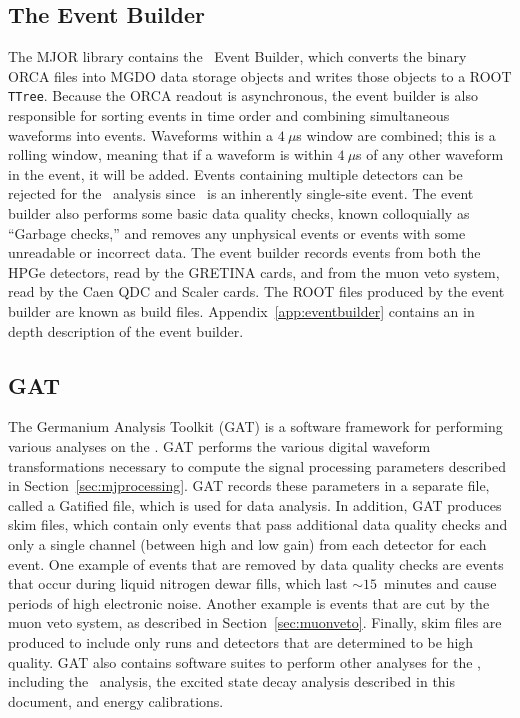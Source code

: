 \documentclass[/main.tex]{subfiles}
\begin{document}
\subsection{The Event Builder}\label{sec:eventbuilder}
The MJOR library contains the \MJ\ Event Builder, which converts the binary ORCA files into MGDO data storage objects and writes those objects to a ROOT \texttt{TTree}.
Because the ORCA readout is asynchronous, the event builder is also responsible for sorting events in time order and combining simultaneous waveforms into events.
Waveforms within a $4~\mu$s window are combined; this is a rolling window, meaning that if a waveform is within $4~\mu$s of any other waveform in the event, it will be added.
Events containing multiple detectors can be rejected for the \znbb\ analysis since \znbb\ is an inherently single-site event.
The event builder also performs some basic data quality checks, known colloquially as ``Garbage checks,'' and removes any unphysical events or events with some unreadable or incorrect data.
The event builder records events from both the HPGe detectors, read by the GRETINA cards, and from the muon veto system, read by the Caen QDC and Scaler cards.
The ROOT files produced by the event builder are known as build files.
Appendix~\ref{app:eventbuilder} contains an in depth description of the event builder.

\subsection{GAT}
The Germanium Analysis Toolkit (GAT) is a software framework for performing various analyses on the \MJD.
GAT performs the various digital waveform transformations necessary to compute the signal processing parameters described in Section~\ref{sec:mjprocessing}.
GAT records these parameters in a separate file, called a Gatified file, which is used for data analysis.
In addition, GAT produces skim files, which contain only events that pass additional data quality checks and only a single channel (between high and low gain) from each detector for each event.
One example of events that are removed by data quality checks are events that occur during liquid nitrogen dewar fills, which last ${\sim}15$~minutes and cause periods of high electronic noise.
Another example is events that are cut by the muon veto system, as described in Section~\ref{sec:muonveto}.
Finally, skim files are produced to include only runs and detectors that are determined to be high quality.
GAT also contains software suites to perform other analyses for the \MJD, including the \znbb\ analysis, the excited state decay analysis described in this document, and energy calibrations.
\end{document}
